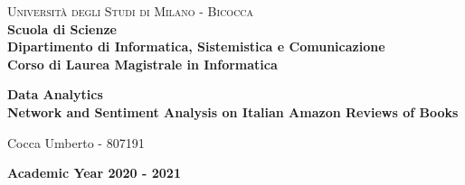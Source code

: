 \documentclass[a4paper,12pt]{article}
\renewcommand{\baselinestretch}{1.5}
\begin{document}
\begin{titlepage}
\noindent
    \vspace*{5mm}
	\begin{minipage}[t]{0.15\textwidth}
	    \vspace*{5mm}
	\end{minipage}
	\hspace{1cm}
	\begin{minipage}[t]{0.9\textwidth}
	      \vspace*{5mm}
		{
			{\textsc{Università degli Studi di Milano - Bicocca} } \\
			\textbf{Scuola di Scienze} \\
			\textbf{Dipartimento di Informatica, Sistemistica e Comunicazione} \\
			\textbf{Corso di Laurea Magistrale in Informatica} \\
			\par
		}
	\end{minipage}
	
	\vspace{42mm}

\begin{center}
    {\LARGE{
            \textbf{
            	Data Analytics \\ 
            	Network and Sentiment Analysis on Italian Amazon Reviews of Books}
    }}        
\end{center}

\vspace{40mm}
	
	
	\begin{flushright}
		\large{Cocca Umberto - 807191} 
	\end{flushright}
	
	\vspace{15mm}
	\begin{center}
		{\large{\bf Academic Year 2020 - 2021}}
	\end{center}


\renewcommand{\baselinestretch}{1.5}

\end{titlepage}
\end{document}
